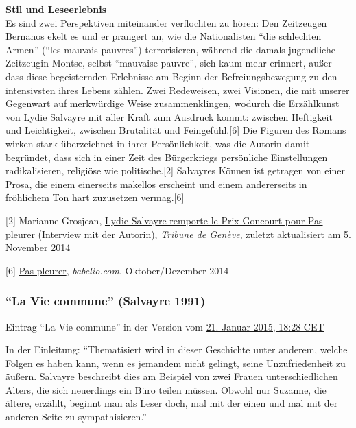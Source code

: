 \documentclass[fontsize=12pt]{scrartcl}
\begin{document}
\textbf{Stil und Leseerlebnis}\\
Es sind zwei Perspektiven miteinander verflochten zu h\"oren: Den Zeitzeugen Ber\-na\-nos ekelt es und er prangert an, wie die Nationalisten "`die schlechten Armen"' ("`les mauvais pauvres"') terrorisieren, w\"ahrend die damals jugendliche Zeitzeugin Montse, \mbox{selbst} "`mauvaise pauvre"', sich kaum mehr erinnert, au{\ss}er dass diese begeisternden Erlebnisse am Beginn der Befreiungsbewegung zu den intensivsten ihres Lebens z\"ahlen. Zwei Redeweisen, zwei Visionen, die mit unserer Gegenwart auf merkw\"urdige Weise zusammenklingen, wodurch die Erz\"ahlkunst von Lydie Salvayre mit aller Kraft zum Ausdruck kommt: zwischen Heftigkeit und Leichtigkeit, zwischen Brutalit\"at und Feinge\-f\"uhl.[6] Die Figuren des Romans wirken stark \"uberzeichnet in ihrer Pers\"onlichkeit, was die Autorin damit begr\"undet, dass sich in einer Zeit des B\"urgerkriegs pers\"onliche Einstellungen radikalisieren, religi\"ose wie politische.[2] Salvayres K\"onnen ist getragen von einer Prosa, die einem einerseits makellos erscheint und einem an\-de\-rerseits in fr\"ohlichem Ton hart zuzusetzen vermag.[6]

{\tiny[2] Marianne Grosjean, \href{http://www.tdg.ch/culture/livres/Lydie-Salvayre-injecte-de-la-joie-libertaire-dans-l-horreur-franquiste/story/25099586}{Lydie Salvayre remporte le Prix Goncourt pour Pas pleurer} (Interview mit der Autorin), \textit{Tribune de Gen\`{e}ve}, zu\-letzt aktualisiert am 5. November 2014\par}
{\tiny[6] \href{http://www.babelio.com/livres/Salvayre-Pas-pleurer/633376}{Pas pleurer}, \textit{babelio.com}, Oktober/Dezember 2014\par}

\subsubsection{"`La Vie commune"' (Salvayre 1991)}
\label{subsubsec:6.1.5}

Eintrag "`La Vie commune"' in der Version vom \href{https://de.wikipedia.org/w/index.php?title=La_Vie_commune\&oldid=138022681}{21. Januar 2015, 18:28 CET}

In der Einleitung: "`Thematisiert wird in dieser Geschichte unter anderem, welche Folgen es haben kann, wenn es jemandem nicht gelingt, seine Unzufriedenheit zu \"au{\ss}ern. Salvayre beschreibt dies am Beispiel von zwei Frauen unterschiedlichen Alters, die sich neuerdings ein B\"uro teilen m\"ussen. Obwohl nur Suzanne, die \"altere, erz\"ahlt, beginnt man als Leser doch, mal mit der einen und mal mit der anderen Seite zu sympathisieren."'
\end{document}
